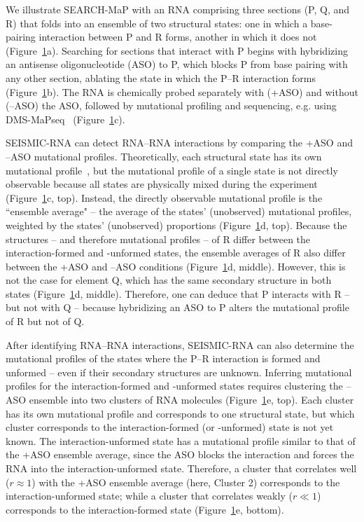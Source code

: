 \documentclass[main.tex]{subfiles}
\begin{document}
\begin{figure}[H]
	\label{strat}
\end{figure}

We illustrate SEARCH-MaP with an RNA comprising three sections (P, Q, and R) that folds into an ensemble of two structural states: one in which a base-pairing interaction between P and R forms, another in which it does not (Figure~\ref{strat}a).
Searching for sections that interact with P begins with hybridizing an antisense oligonucleotide (ASO) to P, which blocks P from base pairing with any other section, ablating the state in which the P--R interaction forms (Figure~\ref{strat}b).
The RNA is chemically probed separately with (+ASO) and without (--ASO) the ASO, followed by mutational profiling and sequencing, e.g. using DMS-MaPseq~\cite{Zubradt2016} (Figure~\ref{strat}c).

SEISMIC-RNA can detect RNA--RNA interactions by comparing the +ASO and --ASO mutational profiles.
Theoretically, each structural state has its own mutational profile~\cite{Sherpa2015}, but the mutational profile of a single state is not directly observable because all states are physically mixed during the experiment (Figure~\ref{strat}c, top).
Instead, the directly observable mutational profile is the ``ensemble average" -- the average of the states' (unobserved) mutational profiles, weighted by the states' (unobserved) proportions (Figure~\ref{strat}d, top).
Because the structures -- and therefore mutational profiles -- of R differ between the interaction-formed and -unformed states, the ensemble averages of R also differ between the +ASO and --ASO conditions (Figure~\ref{strat}d, middle).
However, this is not the case for element Q, which has the same secondary structure in both states (Figure~\ref{strat}d, middle).
Therefore, one can deduce that P interacts with R -- but not with Q -- because hybridizing an ASO to P alters the mutational profile of R but not of Q.

After identifying RNA--RNA interactions, SEISMIC-RNA can also determine the mutational profiles of the states where the P--R interaction is formed and unformed -- even if their secondary structures are unknown.
Inferring mutational profiles for the interaction-formed and -unformed states requires clustering the --ASO ensemble into two clusters of RNA molecules (Figure~\ref{strat}e, top).
Each cluster has its own mutational profile and corresponds to one structural state, but which cluster corresponds to the interaction-formed (or -unformed) state is not yet known.
The interaction-unformed state has a mutational profile similar to that of the +ASO ensemble average, since the ASO blocks the interaction and forces the RNA into the interaction-unformed state.
Therefore, a cluster that correlates well ($r \approx 1$) with the +ASO ensemble average (here, Cluster 2) corresponds to the interaction-unformed state; while a cluster that correlates weakly ($r \ll 1$) corresponds to the interaction-formed state (Figure~\ref{strat}e, bottom).
\end{document}

